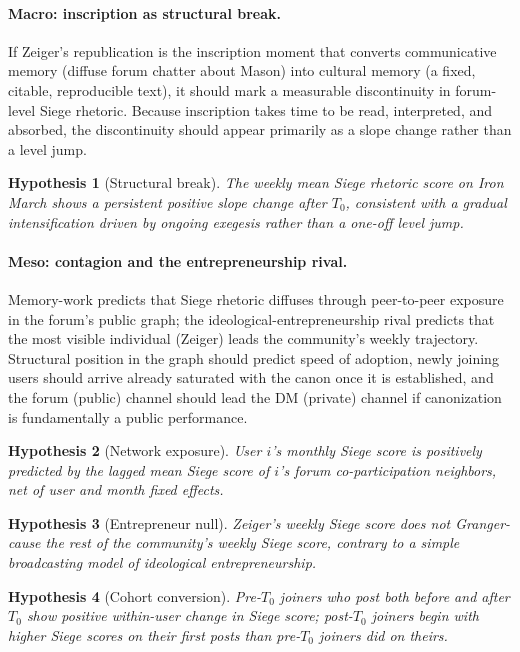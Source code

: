 \documentclass[bibtex,autowc,nonblind]{apsr_submission}
\newtheorem{hyp}{Hypothesis}
\begin{document}
\paragraph{Macro: inscription as structural break.} If Zeiger's republication is the inscription moment that converts communicative memory (diffuse forum chatter about Mason) into cultural memory (a fixed, citable, reproducible text), it should mark a measurable discontinuity in forum-level Siege rhetoric. Because inscription takes time to be read, interpreted, and absorbed, the discontinuity should appear primarily as a slope change rather than a level jump.

\begin{hyp}[Structural break]
The weekly mean Siege rhetoric score on Iron March shows a persistent positive slope change after $T_0$, consistent with a gradual intensification driven by ongoing exegesis rather than a one-off level jump.
\end{hyp}

\paragraph{Meso: contagion and the entrepreneurship rival.} Memory-work predicts that Siege rhetoric diffuses through peer-to-peer exposure in the forum's public graph; the ideological-entrepreneurship rival predicts that the most visible individual (Zeiger) leads the community's weekly trajectory. Structural position in the graph should predict speed of adoption, newly joining users should arrive already saturated with the canon once it is established, and the forum (public) channel should lead the DM (private) channel if canonization is fundamentally a public performance.

\begin{hyp}[Network exposure]
User $i$'s monthly Siege score is positively predicted by the lagged mean Siege score of $i$'s forum co-participation neighbors, net of user and month fixed effects.
\end{hyp}

\begin{hyp}[Entrepreneur null]
Zeiger's weekly Siege score does not Granger-cause the rest of the community's weekly Siege score, contrary to a simple broadcasting model of ideological entrepreneurship.
\end{hyp}

\begin{hyp}[Cohort conversion]
Pre-$T_0$ joiners who post both before and after $T_0$ show positive within-user change in Siege score; post-$T_0$ joiners begin with higher Siege scores on their first posts than pre-$T_0$ joiners did on theirs.
\end{hyp}
\end{document}
